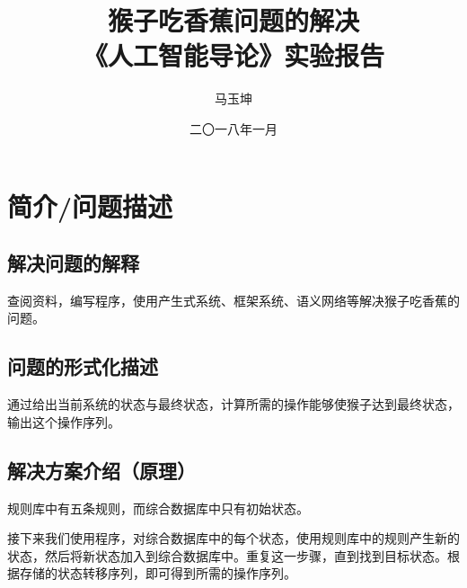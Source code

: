 \documentclass[forprint]{WHUBachelor}
\begin{document}

\title{猴子吃香蕉问题的解决 \\ {\Large《人工智能导论》实验报告}}
\author{马玉坤}                            %
\date{二〇一八年一月}                    %

\maketitle
\frontmatter
{}              %
\tableofcontents
\mainmatter %

\chapter{简介/问题描述}

\section{解决问题的解释}
查阅资料\cite{AI}，编写程序，使用产生式系统、框架系统、语义网络等解决猴子吃香蕉的问题。

\section{问题的形式化描述}

通过给出当前系统的状态与最终状态，计算所需的操作能够使猴子达到最终状态，输出这个操作序列。

\section{解决方案介绍（原理）}

规则库中有五条规则，而综合数据库中只有初始状态。

接下来我们使用程序，对综合数据库中的每个状态，使用规则库中的规则产生新的状态，然后将新状态加入到综合数据库中。重复这一步骤，直到找到目标状态。根据存储的状态转移序列，即可得到所需的操作序列。
\end{document}
